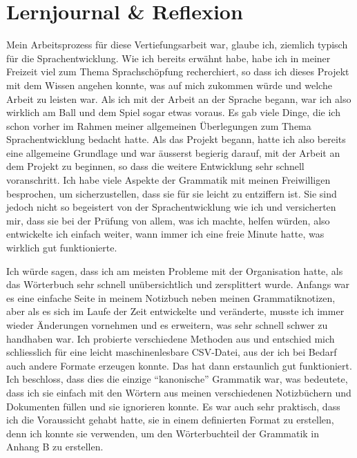 \documentclass{article}
\begin{document}
\section{Lernjournal \& Reflexion}
Mein Arbeitsprozess für diese Vertiefungsarbeit war, glaube ich, ziemlich typisch für die Sprachentwicklung.
Wie ich bereits erwähnt habe, habe ich in meiner Freizeit viel zum Thema Sprachschöpfung recherchiert,
so dass ich dieses Projekt mit dem Wissen angehen konnte, was auf mich zukommen würde und welche Arbeit zu
leisten war. Als ich mit der Arbeit an der Sprache begann, war ich also wirklich am Ball und dem Spiel sogar
etwas voraus. Es gab viele Dinge, die ich schon vorher im Rahmen meiner allgemeinen Überlegungen zum Thema
Sprachentwicklung bedacht hatte. Als das Projekt begann, hatte ich also bereits eine allgemeine Grundlage
und war äusserst begierig darauf, mit der Arbeit an dem Projekt zu beginnen, so dass die weitere Entwicklung
sehr schnell voranschritt. Ich habe viele Aspekte der Grammatik mit meinen Freiwilligen besprochen,
um sicherzustellen, dass sie für sie leicht zu entziffern ist.
Sie sind jedoch nicht so begeistert von der Sprachentwicklung wie ich und versicherten mir, dass sie bei
der Prüfung von allem, was ich machte, helfen würden, also entwickelte ich einfach weiter, wann immer ich
eine freie Minute hatte, was wirklich gut funktionierte.

Ich würde sagen, dass ich am meisten Probleme mit der Organisation hatte,
als das Wörterbuch sehr schnell unübersichtlich und zersplittert wurde.
Anfangs war es eine einfache Seite in meinem Notizbuch neben meinen Grammatiknotizen,
aber als es sich im Laufe der Zeit entwickelte und veränderte, musste ich immer wieder Änderungen
vornehmen und es erweitern, was sehr schnell schwer zu handhaben war. Ich probierte verschiedene
Methoden aus und entschied mich schliesslich für eine leicht maschinenlesbare CSV-Datei,
aus der ich bei Bedarf auch andere Formate erzeugen konnte. Das hat dann erstaunlich gut funktioniert.
Ich beschloss, dass dies die einzige ``kanonische'' Grammatik war, was bedeutete, dass ich sie einfach mit
den Wörtern aus meinen verschiedenen Notizbüchern und Dokumenten füllen und sie ignorieren konnte.
Es war auch sehr praktisch, dass ich die Voraussicht gehabt hatte, sie in einem definierten Format
zu erstellen, denn ich konnte sie verwenden, um den Wörterbuchteil der Grammatik in Anhang B zu erstellen.
\end{document}
